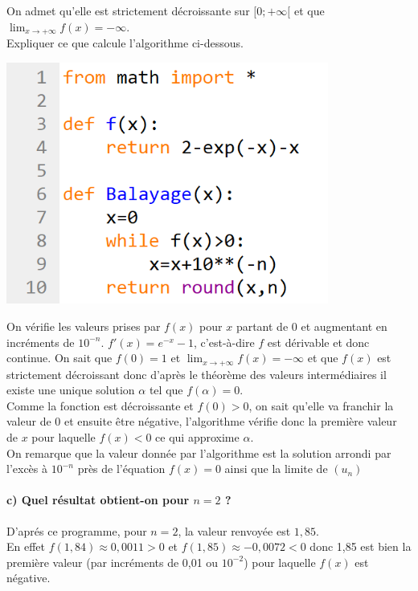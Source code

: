 \documentclass[a4paper, 12pt]{article}
\begin{document}
On admet qu'elle est strictement décroissante sur $[0;+\infty[$ et que $\displaystyle \lim_{x \to +\infty}f(x)=-\infty$.
\\
Expliquer ce que calcule l'algorithme ci-dessous.
\begin{center}
\includegraphics[width=300pt, frame]{ControleCommunMathsCodeExercice4.png}
\end{center}
On vérifie les valeurs prises par $f(x)$ pour $x$ partant de 0 et augmentant en incréments de $10^{-n}$. 
$f'(x)=e^{-x}-1$, c'est-à-dire $f$ est dérivable et donc continue. 
On sait que $f(0) = 1$ et $\displaystyle \lim_{x \to +\infty}f(x) = -\infty$ et que 
$f(x)$ est strictement décroissant donc d'après le théorème des valeurs intermédiaires il existe une unique solution $\alpha$ tel que $f(\alpha)=0$. 
\\[2mm]
Comme la fonction est décroissante et $f(0)>0$, on sait qu'elle va franchir la valeur de 0 et ensuite être négative, l'algorithme vérifie donc la première valeur de $x$ 
pour laquelle $f(x)<0$ ce qui approxime $\alpha$. 
\\[2mm]
On remarque que la valeur donnée par l'algorithme est la solution arrondi par l'excès à $10^{-n}$ près de l'équation $f(x)=0$ ainsi que la limite de $(u_n)$

{}
\paragraph*{c) Quel résultat obtient-on pour $n=2$ ?\\[5mm]}

D'aprés ce programme, pour $n=2$, la valeur renvoyée est $1,85$. 
\\
En effet $f(1,84) \approx 0,0011 >0$ et $f(1,85) \approx -0,0072 < 0$ donc 1,85 est bien la première valeur (par incréments de 0,01 ou $10^{-2}$) pour laquelle $f(x)$ est négative.

\newpage
{}
\tableofcontents
\end{document}
